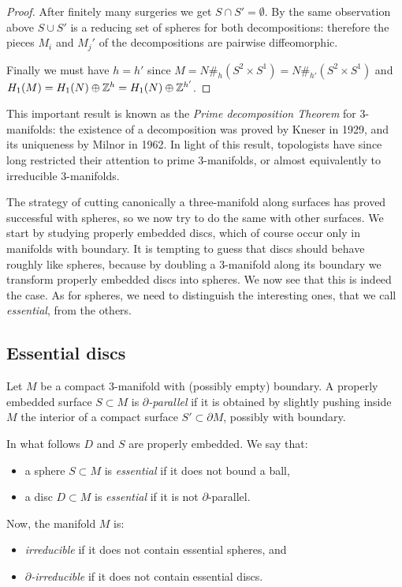 \begin{proof}
After finitely many surgeries we get $S\cap S'=\emptyset$. By the same observation above $S\cup S'$ is a reducing set of spheres for both decompositions: therefore the pieces $M_i$ and $M_j'$ of the decompositions are pairwise diffeomorphic.

Finally we must have $h=h'$ since $M=N\#_h(S^2\times S^1) = N\#_{h'}(S^2\times S^1)$ and $H_1(M) = H_1(N) \oplus \mathbb{Z}^h = H_1(N) \oplus \mathbb{Z}^{h'}$.
\end{proof}

This important result is known as the \emph{Prime decomposition Theorem} for 3-manifolds: the existence of a decomposition was proved by Kneser \cite{Kn} in 1929, and its uniqueness by Milnor \cite{Mi} in 1962. In light of this result, topologists have since long restricted their attention to prime 3-manifolds, or almost equivalently to irreducible 3-manifolds.

The strategy of cutting canonically a three-manifold along surfaces has proved successful with spheres, so we now try to do the same with other surfaces. We start by studying properly embedded discs, which of course occur only in manifolds with boundary. It is tempting to guess that discs should behave roughly like spheres, because by doubling a 3-manifold along its boundary we transform properly embedded discs into spheres. We now see that this is indeed the case. As for spheres, we need to distinguish the interesting ones, that we call \emph{essential}, from the others.

\subsection{Essential discs} \label{essential:discs:subsection}
Let $M$ be a compact 3-manifold with (possibly empty) boundary. A properly embedded surface $S\subset M$ is \emph{$\partial$-parallel} if it is obtained by slightly pushing inside $M$ the interior of a compact surface $S'\subset \partial M$, possibly with boundary. 

In what follows $D$ and $S$ are properly embedded. 
We say that:
\begin{itemize}
\item a sphere $S\subset M$ is \emph{essential} if it does not bound a ball, 
\item a disc $D\subset M$ is \emph{essential} if it is not $\partial$-parallel.
\end{itemize}
Now, the manifold $M$ is:
\begin{itemize}
\item \emph{irreducible} if it does not contain essential spheres, and
\item \emph{$\partial$-irreducible} if it does not contain essential discs.
\end{itemize}

